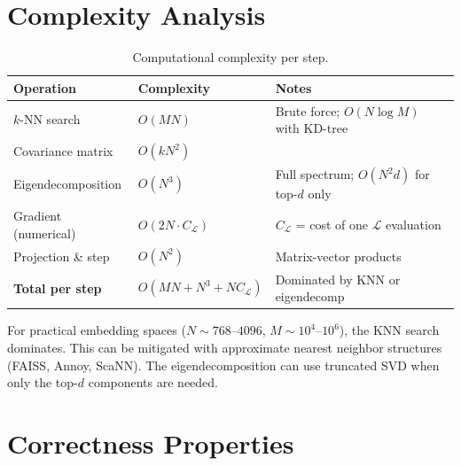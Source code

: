 \documentclass[11pt,letterpaper]{article}
\newcommand{\obj}{\mathcal{L}}
\begin{document}
\section{Complexity Analysis}
\label{sec:complexity}

\begin{table}[h]
\centering
\caption{Computational complexity per step.}
\label{tab:complexity}
\begin{tabular}{@{}lll@{}}
\toprule
\textbf{Operation} & \textbf{Complexity} & \textbf{Notes} \\
\midrule
$k$-NN search & $O(MN)$ & Brute force; $O(N \log M)$ with KD-tree \\
Covariance matrix & $O(k N^2)$ & \\
Eigendecomposition & $O(N^3)$ & Full spectrum; $O(N^2 d)$ for top-$d$ only \\
Gradient (numerical) & $O(2N \cdot C_\obj)$ & $C_\obj$ = cost of one $\obj$ evaluation \\
Projection \& step & $O(N^2)$ & Matrix-vector products \\
\midrule
\textbf{Total per step} & $O(MN + N^3 + NC_\obj)$ & Dominated by KNN or eigendecomp \\
\bottomrule
\end{tabular}
\end{table}

For practical embedding spaces ($N \sim 768$--$4096$, $M \sim 10^4$--$10^6$),
the KNN search dominates. This can be mitigated with approximate nearest
neighbor structures (FAISS, Annoy, ScaNN). The eigendecomposition can use
truncated SVD when only the top-$d$ components are needed.

\section{Correctness Properties}
\label{sec:correctness}
\end{document}
